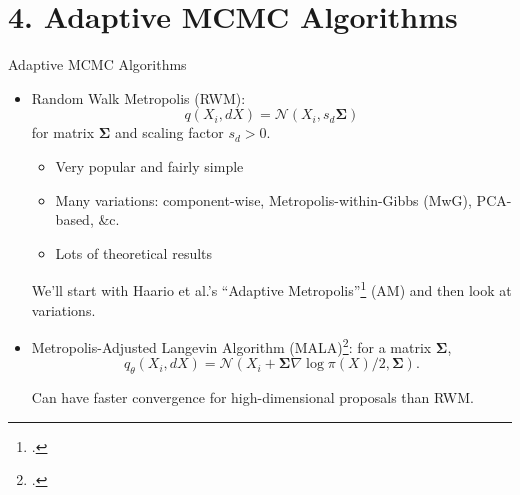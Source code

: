 \documentclass[aspectratio=169]{beamer}
\begin{document}
\section{4. Adaptive MCMC Algorithms}
\begin{frame}{Adaptive MCMC Algorithms}
    \begin{itemize}%
        \item \alert{Random Walk Metropolis (RWM)}: 
        $$q(X_i, dX) = \mathcal{N}(X_i, s_d \bm{\Sigma})$$
         for matrix $\bm{\Sigma}$ and scaling factor $s_d > 0$.
            \pause
            \begin{itemize}
                \item Very popular and fairly simple
                \item Many variations: component-wise, Metropolis-within-Gibbs (MwG), PCA-based, \&c. 
                \item Lots of theoretical results
            \end{itemize}
            \pause
            We'll start with Haario et al.'s ``Adaptive Metropolis''\footcite{haario_adaptive_2001} (AM) and then look at variations.
        
        \pause
        \item \alert{Metropolis-Adjusted Langevin Algorithm (MALA)}\footcite{gilks_adaptive_1998}: for a matrix $\bm{\Sigma}$,
        $$q_\theta(X_i, dX) = \mathcal{N}(X_i + \bm{\Sigma} \nabla \log \pi(X)/2, \bm{\Sigma}).$$

        \pause
        Can have faster convergence for high-dimensional proposals than RWM.
            
    \end{itemize}

\end{frame}
\end{document}
